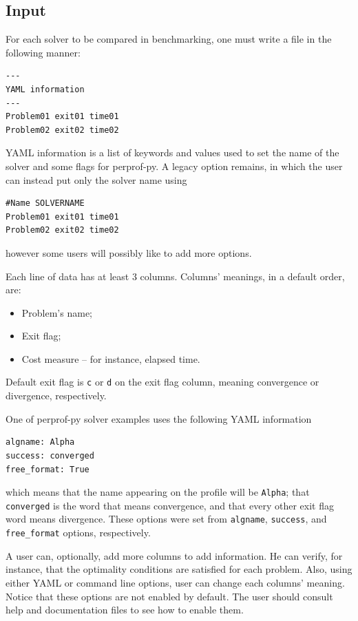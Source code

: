 \subsection*{Input}

    For each solver to be compared in  benchmarking, one must write a file in
    the following manner:

    \begin{verbatim}
---
YAML information
---
Problem01 exit01 time01
Problem02 exit02 time02
    \end{verbatim}

    YAML\cite{url:yaml,url:pyyaml} information is a list of keywords and values used to
    set the name of the solver and some
    flags for perprof-py.
    A legacy option remains, in which the user can instead put only the
    solver name using
\begin{verbatim}
#Name SOLVERNAME
Problem01 exit01 time01
Problem02 exit02 time02
\end{verbatim}
    however some users  will possibly like to
    add more options.

    Each line of data has at least 3 columns.
    Columns' meanings, in a default order, are:
    \begin{itemize}
      \item Problem's name;
      \item Exit flag;
      \item Cost measure -- for instance, elapsed time.
    \end{itemize}
    Default exit flag is  {\tt c} or {\tt d} on the exit flag
    column, meaning convergence or divergence, respectively.

    One of perprof-py solver examples  uses the following YAML information
\begin{verbatim}
algname: Alpha
success: converged
free_format: True
\end{verbatim}
    which means that the name appearing on the profile will be {\tt Alpha};
    that {\tt converged} is the word that means convergence,
    and that every other exit flag word means divergence.
    These options were set from {\tt algname}, {\tt success}, and {\tt
    free\_format} options, respectively.

    A user can, optionally, add more columns to add information.
    He can verify, for instance, that the optimality conditions are satisfied
    for each problem.
    Also, using  either YAML or command line options,  user can change each
    columns' meaning.
    Notice that these options are not enabled by default. The user should
    consult  help and documentation files to see how to enable them.

